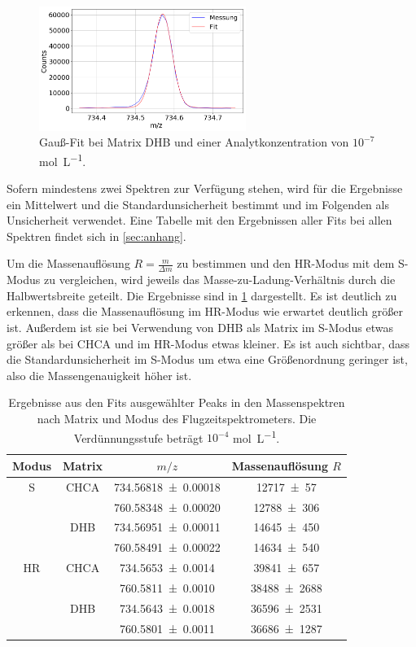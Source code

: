 \begin{figure}[!ht]
    \centering
    \includegraphics[width=0.6\textwidth]{img/a04_S_gaussfit}
    \caption{Gauß-Fit bei Matrix DHB und einer Analytkonzentration von $10^{-7}$ \si{\mole \per \liter}.}
    \label{fig_gaussfit}
\end{figure}

Sofern mindestens zwei Spektren zur Verfügung stehen, wird für die Ergebnisse ein Mittelwert und die Standardunsicherheit bestimmt und im Folgenden als Unsicherheit verwendet.
Eine Tabelle mit den Ergebnissen aller Fits bei allen Spektren findet sich in \cref{sec:anhang}.

Um die Massenauflösung $R=\frac{m}{\Delta m}$ zu bestimmen und den HR-Modus mit dem S-Modus zu vergleichen, wird jeweils das Masse-zu-Ladung-Verhältnis durch die Halbwertsbreite geteilt.
Die Ergebnisse sind in \cref{tab:HR-S-vgl} dargestellt.
Es ist deutlich zu erkennen, dass die Massenauflösung im HR-Modus wie erwartet deutlich größer ist.
Außerdem ist sie bei Verwendung von  DHB als Matrix im S-Modus etwas größer als bei CHCA und im HR-Modus etwas kleiner.
Es ist auch sichtbar, dass die Standardunsicherheit im S-Modus um etwa eine Größenordnung geringer ist, also die Massengenauigkeit höher ist.

\begin{table}[H]
	\centering
	\caption{Ergebnisse aus den Fits ausgewählter Peaks in den Massenspektren nach Matrix und Modus des Flugzeitspektrometers. Die Verdünnungsstufe beträgt $10^{-4}$ \si{\mole \per \liter}.}
	   \begin{tabular}{c | c | c | c }
      Modus & Matrix & $m/z$ & Massenauflösung $R$ \\ \hline
      S & CHCA & \SI{734,56818 \pm 0,00018}{} & \SI{12717 \pm 57}{} \\
        &      & \SI{760,58348 \pm 0,00020}{} & \SI{12788 \pm 306}{} \\
        & DHB  & \SI{734,56951 \pm 0,00011}{} & \SI{14645 \pm 450}{} \\
        &      & \SI{760,58491 \pm 0,00022}{} & \SI{14634 \pm 540}{} \\
      HR& CHCA & \SI{734,5653  \pm 0,0014}{}  & \SI{39841 \pm 657}{} \\
        &      & \SI{760,5811  \pm 0,0010}{}  & \SI{38488 \pm 2688}{} \\
        & DHB  & \SI{734,5643  \pm 0,0018}{}  & \SI{36596 \pm 2531}{} \\
        &      & \SI{760,5801  \pm 0,0011}{}  & \SI{36686 \pm 1287}{} \\
	\end{tabular}
	\label{tab:HR-S-vgl}
\end{table}

